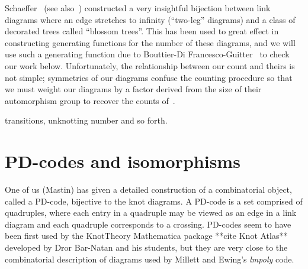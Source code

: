 \documentclass[amsmath,secnumarabic,floatfix,amssymb,nofootinbib,nobibnotes,letterpaper,11pt,tightenlines,showkeys]{revtex4}
\theoremstyle{definition}
\let\mgp=\marginpar \marginparwidth18mm \marginparsep1mm
\def\marginpar#1{\mgp{\raggedright\tiny #1}}
\let\lbl=\label
\def\label#1{\lbl{#1}\ifinner\else\marginpar{\ref{#1} #1}\ignorespaces\fi}
\begin{document}
Schaeffer~\cite{Schaeffer:1997wo} (see also~\cite{Bouttier:2002iu}) constructed a very insightful bijection between link diagrams where an edge stretches to infinity (``two-leg'' diagrams) and a class of decorated trees called ``blossom trees''. This has been used to great effect in constructing generating functions for the number of these diagrams, and we will use such a generating function due to Bouttier-Di Francesco-Guitter~\cite{Bouttier:2003ib} to check our work below. Unfortunately, the relationship between our count and theirs is not simple; symmetries of our diagrams confuse the counting procedure so that we must weight our diagrams by a factor derived from the size of their automorphism group to recover the counts of~\cite{Bouttier:2003ib}. 


transitions, unknotting number and so forth.

\appendix
\section{PD-codes and isomorphisms}
\label{app:pdcodes}

One of us (Mastin) has given a detailed construction of a combinatorial object,  called a PD-code, bijective to the knot diagrams. A PD-code is a set comprised of quadruples, where each entry in a quadruple may be viewed as an edge in a link diagram and each quadruple corresponds to a crossing. PD-codes seem to have been first used by the KnotTheory Mathematica package **cite Knot Atlas** developed by Dror Bar-Natan and his students, but they are very close to the combinatorial description of diagrams used by Millett and Ewing's \emph{lmpoly} code\cite{MR98k:57010}.

\end{document}
